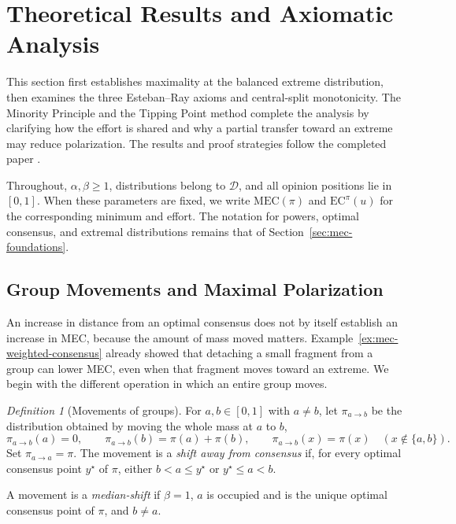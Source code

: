 \documentclass{article}
\theoremstyle{plain}
\theoremstyle{remark}
\newtheorem{definition}{Definition}
\begin{document}
\section{Theoretical Results and Axiomatic Analysis}\label{sec:mec-theory}

This section first establishes maximality at the balanced extreme distribution, then examines the three Esteban--Ray axioms and central-split monotonicity. The Minority Principle and the Tipping Point method complete the analysis by clarifying how the effort is shared and why a partial transfer toward an extreme may reduce polarization. The results and proof strategies follow the completed paper \citep{aranda2026mec}.

Throughout, $\alpha,\beta\geq1$, distributions belong to $\mathcal{D}$, and all opinion positions lie in $[0,1]$. When these parameters are fixed, we write $\mathrm{MEC}(\pi)$ and $\mathrm{EC}^{\pi}(u)$ for the corresponding minimum and effort. The notation for powers, optimal consensus, and extremal distributions remains that of Section~\ref{sec:mec-foundations}.

\subsection{Group Movements and Maximal Polarization}\label{subsec:mec-group-movements}

An increase in distance from an optimal consensus does not by itself establish an increase in MEC, because the amount of mass moved matters. Example~\ref{ex:mec-weighted-consensus} already showed that detaching a small fragment from a group can lower MEC, even when that fragment moves toward an extreme. We begin with the different operation in which an entire group moves.

\begin{definition}[Movements of groups]\label{def:mec-group-movement}
For $a,b\in[0,1]$ with $a\neq b$, let $\pi_{a\to b}$ be the distribution obtained by moving the whole mass at $a$ to $b$,
\[
\pi_{a\to b}(a)=0,\qquad
\pi_{a\to b}(b)=\pi(a)+\pi(b),\qquad
\pi_{a\to b}(x)=\pi(x)\quad(x\notin\{a,b\}).
\]
Set $\pi_{a\to a}=\pi$. The movement is a \emph{shift away from consensus} if, for every optimal consensus point $y^\star$ of $\pi$, either $b<a\leq y^\star$ or $y^\star\leq a<b$.

A movement is a \emph{median-shift} if $\beta=1$, $a$ is occupied and is the unique optimal consensus point of $\pi$, and $b\neq a$.
\end{definition}
\end{document}
